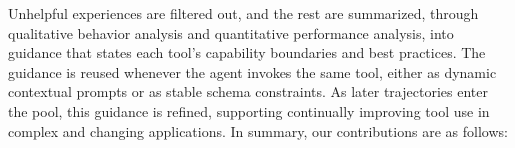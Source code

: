 \documentclass[11pt]{article}
\newcommand{\ours}{\texttt{ExpG}}
\begin{document}
Unhelpful experiences are filtered out, and the rest are summarized, through qualitative behavior analysis and quantitative performance analysis, into guidance that states each tool's capability boundaries and best practices.
The guidance is reused whenever the agent invokes the same tool, either as dynamic contextual prompts or as stable schema constraints. As later trajectories enter the pool, this guidance is refined, supporting continually improving tool use in complex and changing applications. 
In summary, our contributions are as follows:
\end{document}
